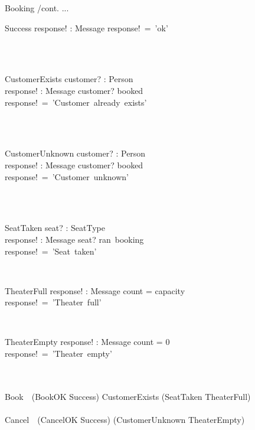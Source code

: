 \documentclass[12pt]{article}
\begin{document}
\newpage

\begin{class}{Booking /cont.}
...\\
\begin{op}{Success}
response! : Message
\where
response!~=~'ok'\\
\end{op}\\
\ \\
\begin{op}{CustomerExists}
customer? : Person\\
response! : Message
\ST
customer? \in booked\\
response!~=~'Customer~already~exists'
\end{op}\\
\ \\
\begin{op}{CustomerUnknown}
customer? : Person\\
response! : Message
\ST
customer? \notin booked\\
response!~=~'Customer~unknown'
\end{op}\\
\ \\
\begin{op}{SeatTaken}
seat? : SeatType\\
response! : Message
\ST
seat? \in ran~booking\\
response!~=~'Seat~taken'
\end{op}\\
\begin{op}{TheaterFull}
response! : Message
\ST
count = capacity\\
response!~=~'Theater~full'
\end{op}\\
\begin{op}{TheaterEmpty}
response! : Message
\ST
count = 0\\
response!~=~'Theater~empty'
\end{op}\\
\ \\
Book~\hat{=}~(BookOK \wedge Success) \oplus CustomerExists
		\oplus (SeatTaken \vee TheaterFull)\\
\ \\
Cancel~\hat{=}~(CancelOK \wedge Success) \oplus 
	(CustomerUnknown \vee TheaterEmpty)\\
\end{class}
\end{document}
